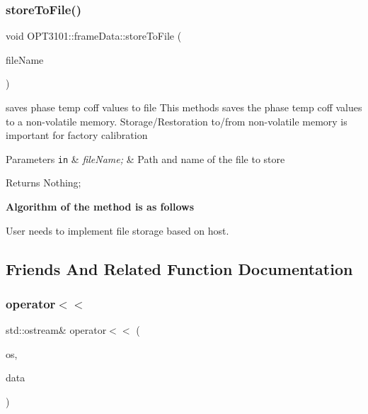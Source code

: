 \subsubsection{\texorpdfstring{store\+To\+File()}{storeToFile()}}
{\footnotesize\ttfamily void O\+P\+T3101\+::frame\+Data\+::store\+To\+File (\begin{DoxyParamCaption}\item[{char $\ast$}]{file\+Name }\end{DoxyParamCaption})}



saves phase temp coff values to file This methods saves the phase temp coff values to a non-\/volatile memory. Storage/\+Restoration to/from non-\/volatile memory is important for factory calibration 


\begin{DoxyParams}[1]{Parameters}
\mbox{\tt in}  & {\em file\+Name;} & Path and name of the file to store \\
\hline
\end{DoxyParams}
\begin{DoxyReturn}{Returns}
Nothing; 
\end{DoxyReturn}
{\bfseries Algorithm of the method is as follows}


\begin{DoxyItemize}
\item User needs to implement file storage based on host. 
\end{DoxyItemize}

\subsection{Friends And Related Function Documentation}
\mbox{\label{class_o_p_t3101_1_1frame_data_a01b42d736d5c28f4061d11fea440e237}} 
\subsubsection{\texorpdfstring{operator$<$$<$}{operator<<}}
{\footnotesize\ttfamily std\+::ostream\& operator$<$$<$ (\begin{DoxyParamCaption}\item[{std\+::ostream \&}]{os,  }\item[{const \mbox{\hyperlink{class_o_p_t3101_1_1frame_data}{frame\+Data}} $\ast$}]{data }\end{DoxyParamCaption})\hspace{0.3cm}{\ttfamily [friend]}}



